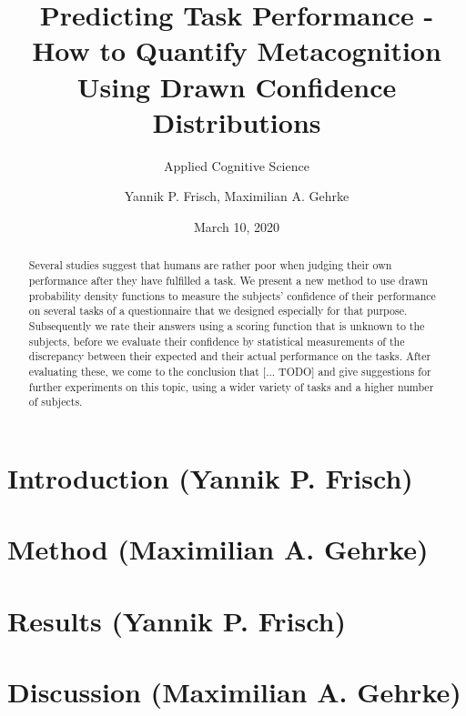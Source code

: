 \documentclass[
pdfa=false,  %
color=9c,
logo=body,
class=article,
marginpar=false,
logofile=../logos/tuda_logo.pdf
]{tudapub}
\author{Yannik P. Frisch, Maximilian A. Gehrke}
\title{Predicting Task Performance - How to Quantify Metacognition Using Drawn Confidence Distributions}
\date{March 10, 2020}
\subtitle{Applied Cognitive Science}
\begin{document}
\maketitle

\begin{abstract}
	Several studies suggest that humans are rather poor when judging their own performance after they have fulfilled a task. We present a new method to use drawn probability density functions to measure the subjects' confidence of their performance on several tasks of a questionnaire that we designed especially for that purpose. Subsequently we rate their answers using a scoring function that is unknown to the subjects, before we evaluate their confidence by statistical measurements of the discrepancy between their expected and their actual performance on the tasks. After evaluating these, we come to the conclusion that [... TODO] and give suggestions for further experiments on this topic, using a wider variety of tasks and a higher number of subjects.
\end{abstract}

\section{Introduction (Yannik P. Frisch)}
	\label{sec:introduction}
	
	
\section{Method (Maximilian A. Gehrke)}
	\label{sec:method}
	
	
\section{Results (Yannik P. Frisch)}
	\label{sec:results}
	
	
\section{Discussion (Maximilian A. Gehrke)}
	\label{sec:discussion}
	


{}

\end{document}
